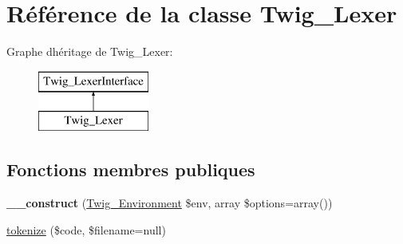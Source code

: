 \hypertarget{class_twig___lexer}{}\section{Référence de la classe Twig\+\_\+\+Lexer}
\label{class_twig___lexer}
Graphe d\textquotesingle{}héritage de Twig\+\_\+\+Lexer\+:\begin{figure}[H]
\begin{center}
\leavevmode
\includegraphics[height=2.000000cm]{class_twig___lexer}
\end{center}
\end{figure}
\subsection*{Fonctions membres publiques}
\begin{DoxyCompactItemize}
\item 
{\bfseries \+\_\+\+\_\+construct} (\hyperlink{class_twig___environment}{Twig\+\_\+\+Environment} \$env, array \$options=array())\hypertarget{class_twig___lexer_ab85dfd54ab416c689e2df82e0b783cc1}{}\label{class_twig___lexer_ab85dfd54ab416c689e2df82e0b783cc1}

\item 
\hyperlink{class_twig___lexer_a8db0ea9f7a98bc3fd2ba77126ab20491}{tokenize} (\$code, \$filename=null)
\end{DoxyCompactItemize}
